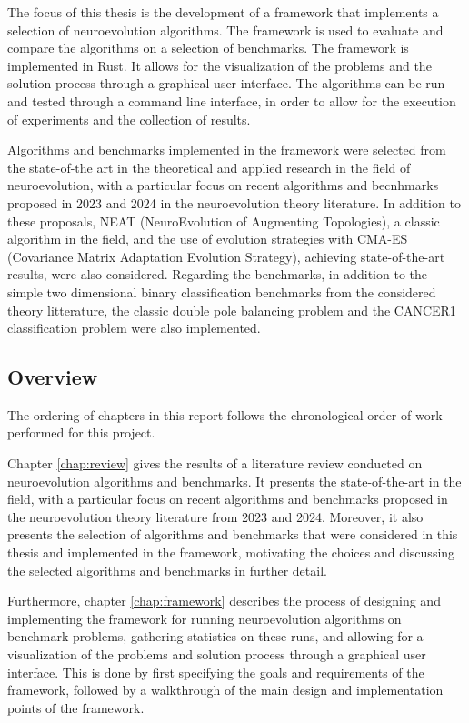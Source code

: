 The focus of this thesis is the development of a framework that implements a selection of neuroevolution algorithms.
The framework is used to evaluate and compare the algorithms on a selection of benchmarks.
The framework is implemented in Rust. It allows for the visualization of the problems and the solution process through a graphical user interface.
The algorithms can be run and tested through a command line interface, in order to allow for the execution of experiments and the collection of results.

Algorithms and benchmarks implemented in the framework were selected from the state-of-the art in the theoretical and applied research in the field of neuroevolution,
with a particular focus on recent algorithms and becnhmarks proposed in 2023 and 2024 in the neuroevolution theory literature.
In addition to these proposals, NEAT (NeuroEvolution of Augmenting Topologies), a classic algorithm in the field, and the use of evolution strategies with CMA-ES
(Covariance Matrix Adaptation Evolution Strategy), achieving state-of-the-art results, were also considered.
Regarding the benchmarks, in addition to the simple two dimensional binary classification benchmarks from the considered theory litterature, the
classic double pole balancing problem and the CANCER1 classification problem were also implemented.

\subsection{Overview}

The ordering of chapters in this report follows the chronological order of work performed for this project.

Chapter \cref{chap:review} gives the results of a literature review conducted on neuroevolution algorithms and benchmarks. It presents the state-of-the-art in the field,
with a particular focus on recent algorithms and benchmarks proposed in the neuroevolution theory literature from 2023 and 2024.
Moreover, it also presents the selection of algorithms and benchmarks that were considered in this thesis and implemented in the framework, motivating the choices and
discussing the selected algorithms and benchmarks in further detail.

Furthermore, chapter \cref{chap:framework} describes the process of designing and implementing the framework for running neuroevolution algorithms on benchmark problems,
gathering statistics on these runs, and allowing for a visualization of the problems and solution process through a graphical user interface. This is done by first
specifying the goals and requirements of the framework, followed by a walkthrough of the main design and implementation points of the framework.

